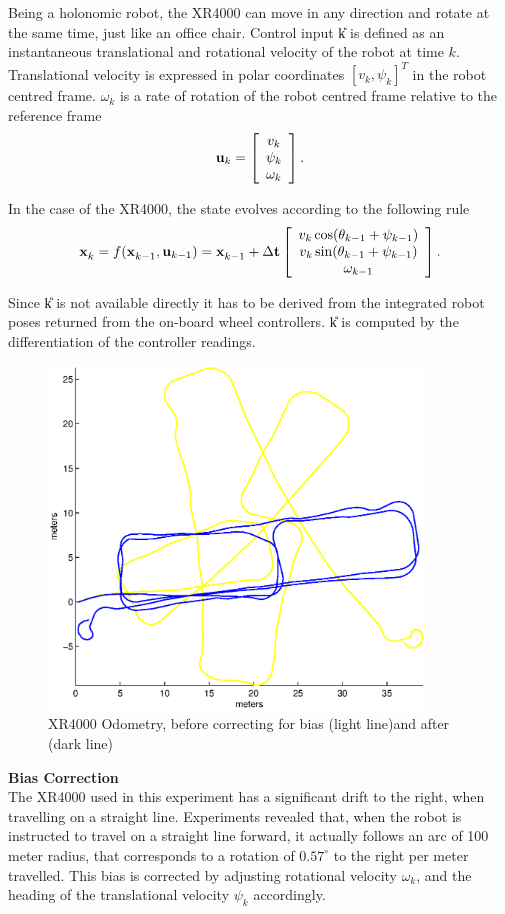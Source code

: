 Being a holonomic robot, the XR4000 can move in any direction and rotate
at the same time, just like an office chair. Control input \U{k} is
defined as an instantaneous translational and rotational velocity of the
robot at time $k$. Translational velocity is expressed in polar
coordinates $[v_k,\psi_k]^T$ in the robot centred frame. $\omega_k$ is a
rate of rotation of the robot centred frame relative to the reference
frame
$$
{\bf u}_{k} = \left[\begin{array}{c} v_k\\ \psi_k \\ \omega_k \end{array} \right].
$$

In the case of the XR4000, the state evolves according to the following
rule
$$
\x{k}{}{} = f(\x{k-1}{}{} ,\U{k-1}) = \x{k-1}{}{} + \Delta {\bf t}
\Vector{v_k\cos(\theta_{k-1} + \psi_{k-1})\\
v_k\sin(\theta_{k-1} + \psi_{k-1})\\
\omega_{k-1}}.
$$

Since \U{k} is not available directly it has to be derived from the
integrated robot poses returned from the on-board wheel controllers.
\U{k} is computed by the differentiation of the controller readings.

\begin{figure}[htbp]
  \centering

  \includegraphics[width=10cm]{Pics/xr4000_raw_odo}
  
  \caption[XR4000 odometry bias]
     {XR4000 Odometry, before correcting for bias (light line)and after (dark line)}
  \label{fig:xr4000_raw_odo}
\end{figure}

{\bf Bias Correction}\\ The XR4000 used in this experiment has a
significant drift to the right, when travelling on a straight
line. Experiments revealed that, when the robot is instructed to travel
on a straight line forward, it actually follows an arc of 100 meter
radius, that corresponds to a rotation of $0.57^\circ$ to the right per
meter travelled. This bias is corrected by adjusting rotational velocity
$\omega_k$, and the heading of the translational velocity $\psi_k$
accordingly.

